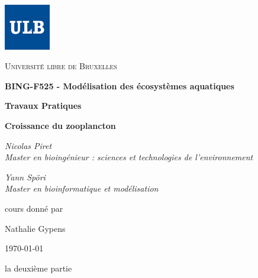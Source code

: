 \documentclass[12pt,a4paper]{article}
\begin{document}
{
\raggedleft
\includegraphics[width=0.15\textwidth]{ulbnorm.jpg}
\par\vspace{-1.8cm}
\centering
{\scshape\LARGE Université libre de Bruxelles \par}
\vspace{2.4cm}
{\Huge\bfseries BING-F525 - Modélisation des écosystèmes aquatiques\par}
\vspace{1.2cm}
{\Large\bfseries Travaux Pratiques\par}
\vspace{1.0cm}
{\LARGE\bfseries Croissance du zooplancton\par}
\vspace{1.5cm}
{\Large\itshape Nicolas Piret\\Master en bioingénieur : sciences et technologies de l'environnement\par}
\vspace{0.5cm}
{\Large\itshape Yann Spöri\\Master en bioinformatique et modélisation\par}
\vfill
cours donné par\par
Nathalie Gypens%
\vfill
\begin{center}{\large \today}\end{center}
}
\newpage
{}

\tableofcontents
\newpage


\FloatBarrier

\FloatBarrier
 la deuxième partie

\FloatBarrier

\FloatBarrier
\end{document}
